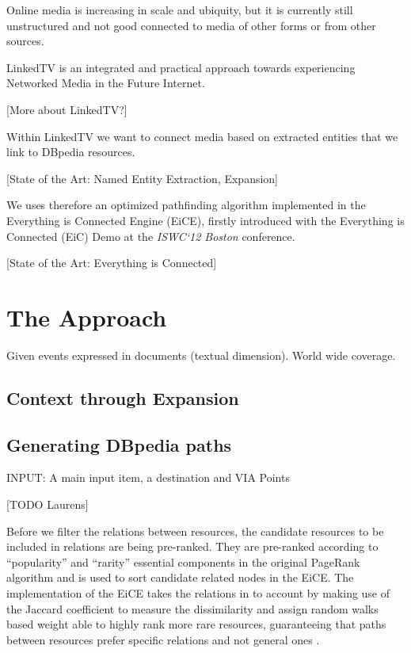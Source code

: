 \documentclass{acm_proc_article-sp}
\begin{document}
Online media is increasing in scale and ubiquity, but it is currently still unstructured and not good connected to media of other forms or from other sources.

LinkedTV is an integrated and practical approach towards experiencing Networked Media in the Future Internet.

[More about LinkedTV?]

Within LinkedTV we want to connect media based on extracted entities that we link to DBpedia resources.

[State of the Art: Named Entity Extraction, Expansion]

We uses therefore an optimized pathfinding algorithm \cite{de2013discovering} implemented in the Everything is Connected Engine (EiCE), firstly introduced with the Everything is Connected (EiC) Demo at the \emph{ISWC`12 Boston} conference.

[State of the Art: Everything is Connected]

\section{The Approach}

Given events expressed in documents (textual dimension). 
World wide coverage.

\subsection{Context through Expansion}



\subsection{Generating DBpedia paths}

INPUT: A main input item, a destination and VIA Points

[TODO Laurens]

Before we filter the relations between resources, the candidate resources to be included in relations are being pre-ranked. They are pre-ranked according to ``popularity'' and ``rarity'' essential components in the original PageRank algorithm \cite{page1999pagerank} and is used to sort candidate related nodes in the EiCE. The implementation of the EiCE takes the relations in to account by making use of the Jaccard coefficient to measure the dissimilarity and assign random walks based weight able to highly rank more rare resources, guaranteeing that paths between resources prefer specific relations and not general ones \cite{moore2012novel}.
\end{document}
